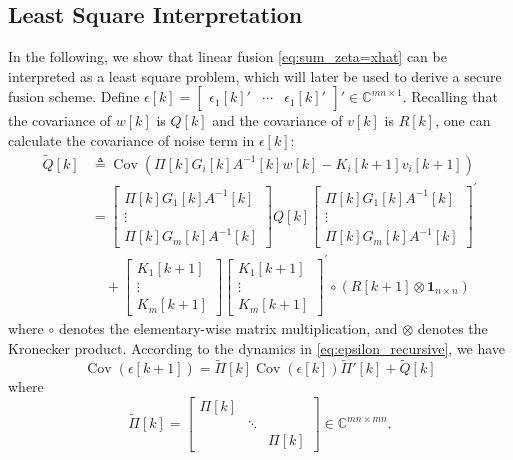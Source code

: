 \documentclass[12pt]{article}
\newcommand{\Cb}{{\mathbb{C}}}
\DeclareMathOperator{\cov}{Cov}
\begin{document}
\subsection{Least Square Interpretation}
In the following, we show that linear fusion \eqref{eq:sum_zeta=xhat} can be interpreted as a least square problem, which will later be used to derive a secure fusion scheme.
Define $
\epsilon[k]=\begin{bmatrix}
\epsilon_1[k]{'} & \cdots & \epsilon_1[k]{'}
\end{bmatrix}{'} \in \Cb^{mn\times 1}.
$
Recalling that the covariance of $w[k]$ is $Q[k]$ and the covariance of $v[k]$ is $R[k]$, one can calculate the covariance of noise term in $\epsilon[k]$:
\begin{align*}
\tilde{Q}[k]&\triangleq \cov\left(\Pi[k] G_i[k] A^{-1}[k] w[k]-K_i[k+1] v_{i}[k+1]\right) \\
&=\begin{bmatrix}
\Pi[k]G_1[k]A^{-1}[k] \\
\vdots \\
\Pi[k]G_m[k]A^{-1}[k]
\end{bmatrix}
Q[k]
\begin{bmatrix}
\Pi[k] G_1[k]A^{-1}[k] \\
\vdots \\
\Pi[k] G_m[k]A^{-1}[k]
\end{bmatrix}^{'}\\
&\quad +\begin{bmatrix}
K_1[k+1] \\
\vdots \\
K_m[k+1]
\end{bmatrix}
\begin{bmatrix}
K_1[k+1] \\
\vdots \\
K_m[k+1]
\end{bmatrix}^{'}
\circ
\left( R[k+1]\otimes \mathbf{1}_{n\times n} \right)
\end{align*}
where $\circ$ denotes the elementary-wise matrix multiplication, and $\otimes$ denotes the Kronecker product.
According to the dynamics in \eqref{eq:epsilon_recursive}, we have
\begin{equation}
\cov(\epsilon[k+1])=\tilde{\Pi}[k] \cov(\epsilon[k]) \tilde{\Pi}{'}[k] +\tilde{Q}[k]
\end{equation}
where
\begin{equation*}
\tilde{\Pi}[k]=
\begin{bmatrix}
\Pi[k] & & \\
& \ddots & \\
& & \Pi[k]
\end{bmatrix}\in\Cb^{mn\times mn} .
\end{equation*}
\end{document}
